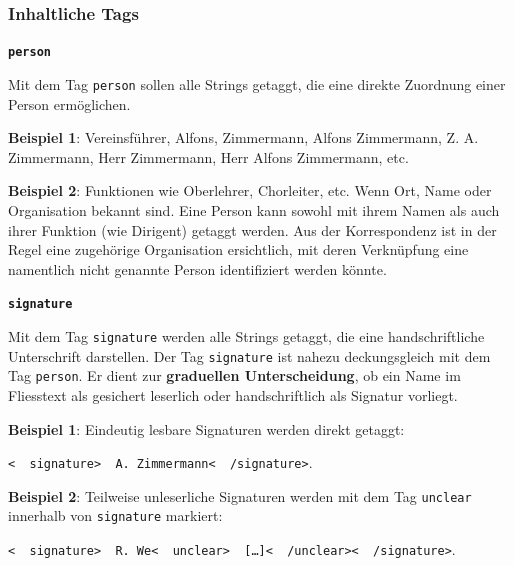 \documentclass[12pt, a4paper, ngerman, bidi=default]{article}
\begin{document}
    \subsubsection{Inhaltliche Tags}
    \begin{description}
    \item\texttt{\textbf{{\colorbox{person}{person}}}}
        
    Mit dem Tag \texttt{\colorbox{person}{person}} sollen alle Strings getaggt, die eine direkte Zuordnung einer Person ermöglichen.
    
    \noindent \textbf{ Beispiel 1}: Vereinsführer, Alfons, Zimmermann, Alfons Zimmermann, Z. A. Zimmermann, Herr Zimmermann, Herr Alfons Zimmermann, etc. 

    \textbf{ Beispiel 2}: Funktionen wie Oberlehrer, Chorleiter, etc.
    Wenn Ort, Name oder Organisation bekannt sind. Eine Person kann sowohl mit ihrem Namen als auch ihrer Funktion (wie Dirigent) getaggt werden.  
    Aus der Korrespondenz ist in der Regel eine zugehörige Organisation ersichtlich, mit deren Verknüpfung eine namentlich nicht genannte Person identifiziert werden könnte.

    
    \item\texttt{\textbf{{\colorbox{signature}{signature}}}}
        
    Mit dem Tag \texttt{\colorbox{signature}{signature}} werden alle Strings getaggt, die eine handschriftliche Unterschrift darstellen.  
    Der Tag \texttt{\colorbox{signature}{signature}} ist nahezu deckungsgleich mit dem Tag \texttt{\colorbox{person}{person}}.  
    Er dient zur \textbf{graduellen Unterscheidung}, ob ein Name im Fliesstext als gesichert leserlich oder handschriftlich als Signatur vorliegt.  
    
    \noindent \textbf{ Beispiel 1}: Eindeutig lesbare Signaturen werden direkt getaggt:  

    \colorbox{VeryLightGray}{\texttt{\textless\ \  signature\textgreater\ \  A. Zimmermann\textless\ \  /signature\textgreater}}. 

    \textbf{ Beispiel 2}: Teilweise unleserliche Signaturen werden mit dem Tag \texttt{\colorbox{unclear}{unclear}} innerhalb von \texttt{\colorbox{signature}{signature}} markiert: 

    \colorbox{VeryLightGray}{\texttt{\textless\ \  signature\textgreater\ \  R. We\textless\ \  unclear\textgreater\ \  [\ldots]\textless\ \  /unclear\textgreater\textless\ \  /signature\textgreater}}. 


\end{description}
\end{document}
